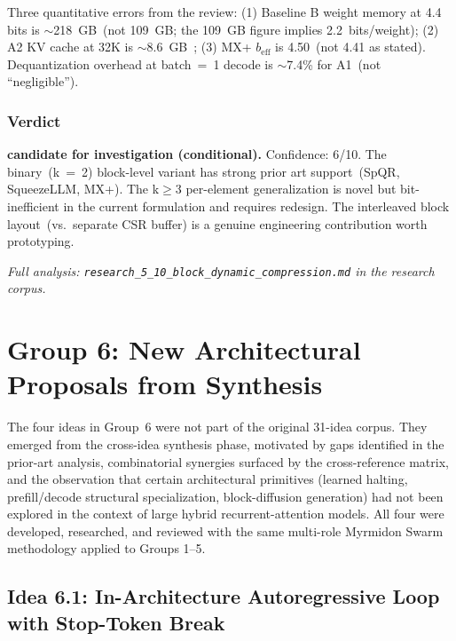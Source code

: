 \documentclass[11pt]{article}
\begin{document}
Three quantitative errors from the review: (1) Baseline B weight memory at 4.4 bits is $\sim$218~GB~(not 109~GB; the 109~GB figure implies 2.2~bits/weight); (2) A2 KV cache at 32K is $\sim$8.6~GB~; (3) MX+ $b_{\text{eff}}$ is 4.50~(not 4.41 as stated). Dequantization overhead at batch~=~1 decode is $\sim$7.4\% for A1~(not ``negligible'').

\subsubsection*{Verdict}

\noindent\textbf{candidate for investigation (conditional).} Confidence: 6/10. The binary~(k~=~2) block-level variant has strong prior art support~(SpQR, SqueezeLLM, MX+). The k$\geq$3 per-element generalization is novel but bit-inefficient in the current formulation and requires redesign. The interleaved block layout~(vs.\ separate CSR buffer) is a genuine engineering contribution worth prototyping.

\par\noindent\textit{Full analysis: \texttt{research\_5\_10\_block\_dynamic\_compression.md} in the research corpus.}


\section{Group 6: New Architectural Proposals from Synthesis}
\label{sec:group6}

The four ideas in Group~6 were not part of the original 31-idea corpus. They emerged from the cross-idea synthesis phase, motivated by gaps identified in the prior-art analysis, combinatorial synergies surfaced by the cross-reference matrix, and the observation that certain architectural primitives (learned halting, prefill/decode structural specialization, block-diffusion generation) had not been explored in the context of large hybrid recurrent-attention models. All four were developed, researched, and reviewed with the same multi-role Myrmidon Swarm methodology applied to Groups 1--5.

\subsection{Idea 6.1: In-Architecture Autoregressive Loop with Stop-Token Break}
\label{sec:idea_6_1}
\end{document}
